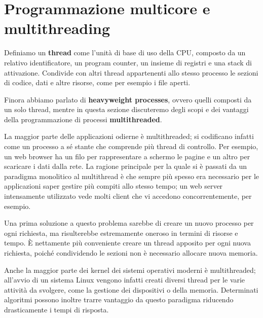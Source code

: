 \section{Programmazione multicore e multithreading}
Definiamo un \textbf{thread} come l'unità di base di uso della CPU, composto da un relativo identificatore, un program counter, un insieme di registri
e una stack di attivazione. Condivide con altri thread appartenenti allo stesso processo le sezioni di codice, dati e altre risorse, come per esempio
i file aperti.\par
Finora abbiamo parlato di \textbf{heavyweight processes}, ovvero quelli composti da un solo thread, mentre in questa sezione discuteremo degli scopi e
dei vantaggi della programmazione di processi \textbf{multithreaded}.\newline

\noindent La maggior parte delle applicazioni odierne è multithreaded; si codificano infatti come un processo a sé stante che comprende più thread di
controllo. Per esempio, un web browser ha un filo per rappresentare a schermo le pagine e un altro per scaricare i dati dalla rete. La ragione
principale per la quale si è passati da un paradigma monolitico al multithread è che sempre più spesso era necessario per le applicazioni saper gestire
più compiti allo stesso tempo; un web server intensamente utilizzato vede molti client che vi accedono concorrentemente, per esempio.\par
Una prima soluzione a questo problema sarebbe di creare un nuovo processo per ogni richiesta, ma risulterebbe estremamente oneroso in termini di risorse
e tempo. È nettamente più conveniente creare un thread apposito per ogni nuova richiesta, poiché condividendo le sezioni non è necessario allocare nuova
memoria.\par
Anche la maggior parte dei kernel dei sistemi operativi moderni è multithreaded; all'avvio di un sistema Linux vengono infatti creati diversi thread per
le varie attività da svolgere, come la gestione dei dispositivi o della memoria. Determinati algoritmi possono inoltre trarre vantaggio da questo
paradigma riducendo drasticamente i tempi di risposta.\newline

